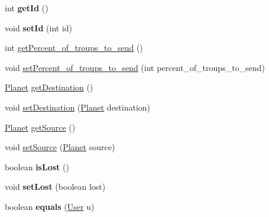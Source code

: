 \begin{DoxyCompactItemize}
int {\bfseries get\+Id} ()
\item 
\mbox{\label{classfr_1_1groupe40_1_1projet_1_1client_1_1_user_a81fb7ded5bdecebd2ddce5d03999f568}} 
void {\bfseries set\+Id} (int id)
\item 
int \mbox{\hyperlink{classfr_1_1groupe40_1_1projet_1_1client_1_1_user_aa1a898620fe07e7b13579cb9f9e7b865}{get\+Percent\+\_\+of\+\_\+troups\+\_\+to\+\_\+send}} ()
\item 
void \mbox{\hyperlink{classfr_1_1groupe40_1_1projet_1_1client_1_1_user_adcf16120e83f73eb8ac0be34fce57b7b}{set\+Percent\+\_\+of\+\_\+troups\+\_\+to\+\_\+send}} (int percent\+\_\+of\+\_\+troups\+\_\+to\+\_\+send)
\item 
\mbox{\hyperlink{classfr_1_1groupe40_1_1projet_1_1model_1_1planets_1_1_planet}{Planet}} \mbox{\hyperlink{classfr_1_1groupe40_1_1projet_1_1client_1_1_user_a1a8f8f74a34b5e4745f23089a223f6d6}{get\+Destination}} ()
\item 
void \mbox{\hyperlink{classfr_1_1groupe40_1_1projet_1_1client_1_1_user_a4b36462569cbce5ac7c47ea1394f9a4c}{set\+Destination}} (\mbox{\hyperlink{classfr_1_1groupe40_1_1projet_1_1model_1_1planets_1_1_planet}{Planet}} destination)
\item 
\mbox{\hyperlink{classfr_1_1groupe40_1_1projet_1_1model_1_1planets_1_1_planet}{Planet}} \mbox{\hyperlink{classfr_1_1groupe40_1_1projet_1_1client_1_1_user_a8d5a9ada62388f690f9dd9d70d4f4d1c}{get\+Source}} ()
\item 
void \mbox{\hyperlink{classfr_1_1groupe40_1_1projet_1_1client_1_1_user_a3da3fb9206c4e00df7700940bd69f601}{set\+Source}} (\mbox{\hyperlink{classfr_1_1groupe40_1_1projet_1_1model_1_1planets_1_1_planet}{Planet}} source)
\item 
\mbox{\label{classfr_1_1groupe40_1_1projet_1_1client_1_1_user_a0e846e067a87f2cedcc43f25968f000f}} 
boolean {\bfseries is\+Lost} ()
\item 
\mbox{\label{classfr_1_1groupe40_1_1projet_1_1client_1_1_user_af0d8095643e7901ef0320d4245da0771}} 
void {\bfseries set\+Lost} (boolean lost)
\item 
\mbox{\label{classfr_1_1groupe40_1_1projet_1_1client_1_1_user_a9ef8e41efa22dad7be2e4b9966ff7818}} 
boolean {\bfseries equals} (\mbox{\hyperlink{classfr_1_1groupe40_1_1projet_1_1client_1_1_user}{User}} u)
\end{DoxyCompactItemize}


